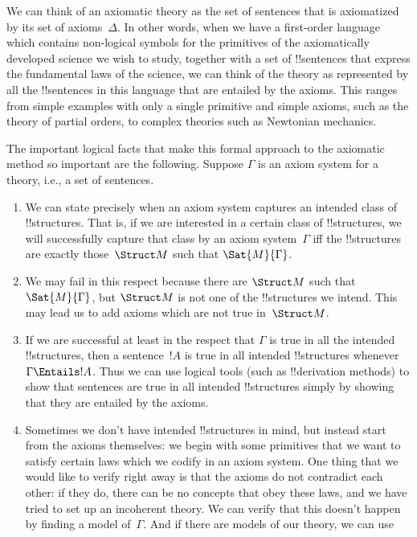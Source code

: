 \begin{explain}
We can think of an axiomatic theory as the set of sentences that is
axiomatized by its set of axioms~$\Delta$.  In other words, when we
have a first-order language which contains non-logical symbols for the
primitives of the axiomatically developed science we wish to study,
together with a set of !!{sentence}s that express the fundamental laws
of the science, we can think of the theory as represented by all the
!!{sentence}s in this language that are entailed by the axioms.  This
ranges from simple examples with only a single primitive and
simple axioms, such as the theory of partial orders, to complex
theories such as Newtonian mechanics.

The important logical facts that make this formal approach to the
axiomatic method so important are the following.  Suppose $\Gamma$ is
an axiom system for a theory, i.e., a set of sentences.
\begin{enumerate}
\item We can state precisely when an axiom system captures an intended
  class of !!{structure}s.  That is, if we are interested in a certain
  class of !!{structure}s, we will successfully capture that class by
  an axiom system~$\Gamma$ iff the !!{structure}s are exactly
  those~$\Struct M$ such that $\Sat{M}{\Gamma}$.
\item We may fail in this respect because there are $\Struct M$ such
  that $\Sat{M}{\Gamma}$, but $\Struct M$ is not one of the
  !!{structure}s we intend.  This may lead us to add axioms which are
  not true in~$\Struct M$.
\item If we are successful at least in the respect that $\Gamma$ is
  true in all the intended !!{structure}s, then a sentence~$!A$ is true in
  all intended !!{structure}s whenever $\Gamma \Entails !A$.  Thus we can
  use logical tools (such as !!{derivation} methods) to show that sentences are
  true in all intended !!{structure}s simply by showing that they are
  entailed by the axioms.
\item Sometimes we don't have intended !!{structure}s in mind, but instead
  start from the axioms themselves: we begin with some primitives that
  we want to satisfy certain laws which we codify in an axiom system.
  One thing that we would like to verify right away is that the axioms
  do not contradict each other: if they do, there can be no concepts
  that obey these laws, and we have tried to set up an incoherent
  theory.  We can verify that this doesn't happen by finding a model
  of~$\Gamma$.  And if there are models of our theory, we can use

\end{enumerate}
\end{explain}

